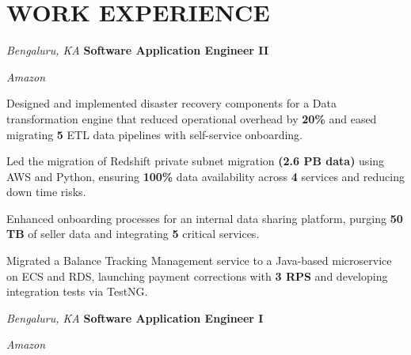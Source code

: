 \section{WORK EXPERIENCE}

\begin{twocolentry}{
    \textit{Bengaluru, KA}}
    \textbf{Software Application Engineer II}
    
    \textit{Amazon}
\end{twocolentry}

\vspace{0.15 cm}
\begin{onecolentry}
    \begin{highlights}
        \item Designed and implemented disaster recovery components for a Data transformation engine that reduced operational overhead by \textbf{20\%} and eased migrating \textbf{5} ETL data pipelines with self-service onboarding.
        \item Led the migration of Redshift private subnet migration \textbf{(2.6 PB data)} using AWS and Python, ensuring  \textbf{100\%} data availability across \textbf{4} services and reducing down time risks.
        \item Enhanced onboarding processes for an internal data sharing platform, purging \textbf{50 TB} of seller data and integrating \textbf{5} critical services.
        \item Migrated a Balance Tracking Management service to a Java-based microservice on ECS and RDS, launching payment corrections with \textbf{3 RPS} and developing integration tests via TestNG.
    \end{highlights}
\end{onecolentry}

\vspace{0.15 cm}

\begin{twocolentry}{
    \textit{Bengaluru, KA}}
    \textbf{Software Application Engineer I}
    
    \textit{Amazon}
\end{twocolentry}

\vspace{0.15 cm}


